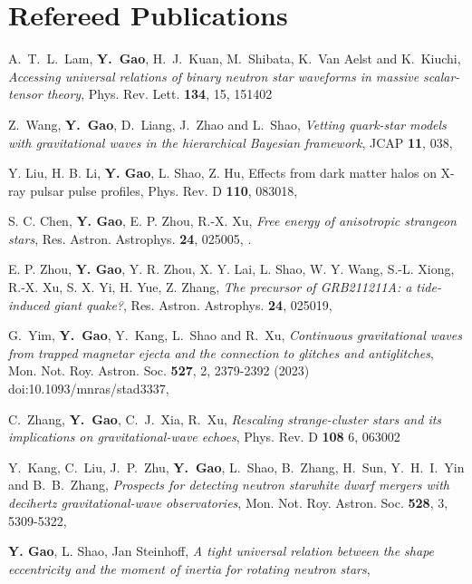 \section{\sc Refereed Publications}
\begin{etaremune}
  \item 
  A.~T.~L.~Lam, {\bf Y.~Gao}, H.~J.~Kuan, M.~Shibata, K.~Van Aelst and K.~Kiuchi,
  {\it Accessing universal relations of binary neutron star waveforms in massive scalar-tensor theory},
  Phys. Rev. Lett. {\bf 134}, 15, 151402
  \item 
  Z.~Wang, {\bf Y.~Gao}, D.~Liang, J.~Zhao and L.~Shao,
  {\it Vetting quark-star models with gravitational waves in the hierarchical Bayesian framework},
  JCAP {\bf 11}, 038,
  \item 
  Y. Liu, H. B. Li, {\bf Y. Gao}, L. Shao, Z. Hu, Effects from dark matter halos on X-ray pulsar pulse profiles, Phys. Rev. D {\bf 110}, 083018, 
  \item 
  S. C. Chen, {\bf Y. Gao}, E. P. Zhou, R.-X. Xu, {\it Free energy of anisotropic strangeon stars}, Res. Astron. Astrophys. {\bf 24}, 025005, .
  \item 
  E. P. Zhou, 
  {\bf Y. Gao}, 
  Y. R. Zhou, 
  X. Y. Lai, L. Shao, W. Y. Wang, S.-L. Xiong, R.-X. Xu, S. X. Yi, H. Yue, Z. Zhang, 
  {\it The precursor of GRB211211A: a tide-induced giant quake?}, Res. Astron. Astrophys. {\bf 24}, 025019,
  \item 
  G.~Yim, {\bf Y.~Gao}, Y.~Kang, L.~Shao and R.~Xu,
  {\it Continuous gravitational waves from trapped magnetar ejecta and the connection to glitches and antiglitches},
  Mon. Not. Roy. Astron. Soc. {\bf 527}, 2, 2379-2392 (2023)
  doi:10.1093/mnras/stad3337, 
  \item 
  C.~Zhang, 
  {\bf Y.~Gao}, 
  C.~J.~Xia,
  R.~Xu,
  {\it Rescaling strange-cluster stars and its implications on gravitational-wave echoes},
  Phys. Rev. D {\bf 108} 6, 063002
  \item 
  Y.~Kang, C.~Liu, J.~P.~Zhu, {\bf Y.~Gao}, L.~Shao, B.~Zhang, H.~Sun, Y.~H.~I.~Yin and B.~B.~Zhang,
  {\it Prospects for detecting neutron star\textendash{}white dwarf mergers with decihertz gravitational-wave observatories},
  Mon. Not. Roy. Astron. Soc. {\bf 528}, 3, 5309-5322,
  \item 
  {\bf Y. Gao},
  L. Shao,
  Jan Steinhoff,
  {\it A tight universal relation between the shape eccentricity and the moment of inertia for rotating neutron stars},

\end{etaremune}
